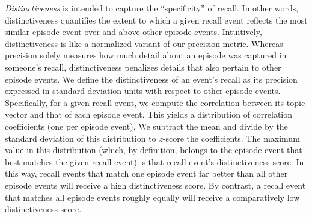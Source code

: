 \documentclass[10pt]{article}
\renewcommand{\includegraphics}[2][]{} %
\providecommand{\DIFaddtex}[1]{{\protect\color{blue}\uwave{#1}}} %
\providecommand{\DIFdeltex}[1]{{\protect\color{red}\sout{#1}}}                      %
\providecommand{\DIFaddbegin}{} %
\providecommand{\DIFaddend}{} %
\providecommand{\DIFdelbegin}{} %
\providecommand{\DIFdelend}{} %
\providecommand{\DIFadd}[1]{\texorpdfstring{\DIFaddtex{#1}}{#1}} %
\providecommand{\DIFdel}[1]{\texorpdfstring{\DIFdeltex{#1}}{}} %
\newcommand{\DIFscaledelfig}{0.5}
\newlength{\DIFdelgraphicswidth} %
\newlength{\DIFdelgraphicsheight} %
\newcommand{\DIFaddincludegraphics}[2][]{{\color{blue}\fbox{\DIFOincludegraphics[#1]{#2}}}} %
\newcommand{\DIFdelincludegraphics}[2][]{%
\sbox{\DIFdelgraphicsbox}{\DIFOincludegraphics[#1]{#2}}%
\settoboxwidth{\DIFdelgraphicswidth}{\DIFdelgraphicsbox} %
\settoboxtotalheight{\DIFdelgraphicsheight}{\DIFdelgraphicsbox} %
\scalebox{\DIFscaledelfig}{%
\parbox[b]{\DIFdelgraphicswidth}{\usebox{\DIFdelgraphicsbox}\\[-\baselineskip] \rule{\DIFdelgraphicswidth}{0em}}\llap{\resizebox{\DIFdelgraphicswidth}{\DIFdelgraphicsheight}{%
\setlength{\unitlength}{\DIFdelgraphicswidth}%
\begin{picture}(1,1)%
\thicklines\linethickness{2pt} %
{\color[rgb]{1,0,0}\put(0,0){\framebox(1,1){}}}%
{\color[rgb]{1,0,0}\put(0,0){\line( 1,1){1}}}%
{\color[rgb]{1,0,0}\put(0,1){\line(1,-1){1}}}%
\end{picture}%
}\hspace*{3pt}}} %
} %
\DeclareRobustCommand{\DIFaddbegin}{\DIFOaddbegin \let\includegraphics\DIFaddincludegraphics} %
\DeclareRobustCommand{\DIFaddend}{\DIFOaddend \let\includegraphics\DIFOincludegraphics} %
\DeclareRobustCommand{\DIFdelbegin}{\DIFOdelbegin \let\includegraphics\DIFdelincludegraphics} %
\DeclareRobustCommand{\DIFdelend}{\DIFOaddend \let\includegraphics\DIFOincludegraphics} %
\begin{document}
\DIFdelbegin \textit{\DIFdel{Distinctiveness}} %
\DIFdelend \DIFaddbegin \DIFadd{Distinctiveness }\DIFaddend is intended to capture the ``specificity'' of recall.  In other words, distinctiveness quantifies the extent to which a given recall event reflects the most similar episode event over and above other episode events.  Intuitively, distinctiveness is like a normalized variant of our precision metric.  Whereas precision solely measures how much detail about an episode was captured in someone's recall, distinctiveness penalizes details that also pertain to other episode events.  We define the distinctiveness of an event's recall as its precision expressed in standard deviation units with respect to other episode events.  Specifically, for a given recall event, we compute the correlation between its topic vector and that of each episode event.  This yields a distribution of correlation coefficients (one per episode event).  We subtract the mean and divide by the standard deviation of this distribution to $z$-score the coefficients.  The maximum value in this distribution (which, by definition, belongs to the episode event that best matches the given recall event) is that recall event's distinctiveness score.  In this way, recall events that match one episode event far better than all other episode events will receive a high distinctiveness score.  By contrast, a recall event that matches all episode events roughly equally will receive a comparatively low distinctiveness score.
\end{document}
